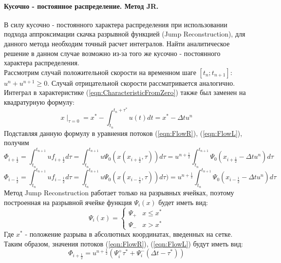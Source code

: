 \documentclass[12pt,a4paper]{article}
\begin{document}
\paragraph{Кусочно - постоянное распределение. Метод JR.}\label{sec:JR_flows}
В силу кусочно - постоянного характера распределения при использовании подхода аппроксимации скачка разрывной функцией (Jump Reconstruction), для данного метода необходим точный расчет интегралов. Найти аналитическое решение в данном случае возможно из-за того же кусочно - постоянного характера распределения.\\
Рассмотрим случай положительной скорости на временном шаге $[t_n; t_{n+1}]$: $u^n+u^{n+1}\geq 0$. Случай отрицательной скорости рассматривается аналогично.\\
Интеграл в характеристике (\ref{eqn:CharacteristicFromZero}) также был заменен на квадратурную формулу:
\begin{equation}
x\mid_{\tau=0}=x^*-\int_{t_n}^{t_n+\tau^*}u(t)dt=x^*-\Delta t u^n
\end{equation}
Подставляя данную формулу в уравнения потоков (\ref{eqn:FlowR}), (\ref{eqn:FlowL}), получим
\begin{equation}
\label{eqn:flowRJR}
\Phi_{i+\frac{1}{2}}=
\int_{t_n}^{t_{n+1}}{u}f_{i+\frac{1}{2}}d\tau=
\int_{t_n}^{t_{n+1}}u\Psi_{0}(x(x_{i+\frac{1}{2}}, \tau))d\tau=
u^{n+\frac{1}{2}}\int_{t_n}^{t_{n+1}}\Psi_{0}( x_{i+\frac{1}{2}}-\Delta t u^n )d\tau
\end{equation}
\begin{equation}
\label{eqn:flowLJR}
\Phi_{i-\frac{1}{2}}=
\int_{t_n}^{t_{n+1}}{u}f_{i-\frac{1}{2}}d\tau=
\int_{t_n}^{t_{n+1}}u\Psi_{0}(x(x_{i-\frac{1}{2}}, \tau))d\tau)=
u^{n+\frac{1}{2}}\int_{t_n}^{t_{n+1}}\Psi_{0}( x_{i-\frac{1}{2}}-\Delta t u^n )d\tau
\end{equation}
Метод Jump Reconstruction работает только на разрывных ячейках, поэтому построенная на разрывной ячейке функция $\Psi_i(x)$ будет иметь вид:
\[
\Psi_i(x)=\begin{cases}\Psi_+ & x\leq x^* \\ \Psi_- & x > x^*\end{cases}
\]
Где $x^*$ - положение разрыва в абсолютных координатах, введенных на сетке.\\
Таким образом, значения потоков (\ref{eqn:FlowR}), (\ref{eqn:FlowL}) будут иметь вид:
\begin{equation}
\label{eqn:FlowRJRPsiCase1}
\Phi_{i+\frac{1}{2}}=u^{n+\frac{1}{2}}(\Psi_i^+\tau^*+\Psi_i^-(\Delta t-\tau^*))
\end{equation}
\end{document}
